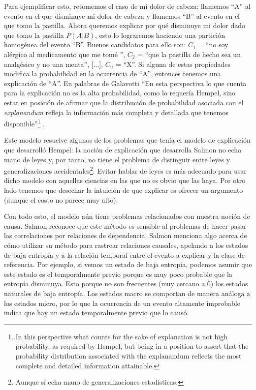 {Para ejemplificar esto, retomemos el caso de mi dolor de cabeza: llamemos ``A'' al evento en el que disminuye mi dolor de cabeza y llamemos ``B'' al evento en el que tomo la pastilla. Ahora queremos explicar por qué disminuye mi dolor dado que tomo la pastilla $P(A|B)$, esto lo lograremos haciendo una partición homogénea del evento ``B''. Buenos candidatos para ello son: $C_{1}$ = ``no soy alérgico al medicamento que me tomé '', $C_{2}$ = ``que la pastilla de hecho sea un analgésico y no una menta'', [...], $C_{n}$ = ``X''. Si alguna de estas propiedades modifica la probabilidad en la ocurrencia de ``A'', entonces tenemos una explicación de ``A''. En palabras de Galavotti ``En esta perspectiva lo que cuenta para la explicación no es la alta probabilidad, como lo requería Hempel, sino estar en posición de afirmar que la distribución de probabilidad asociada con el \textit{explanandum} refleja la información más completa y detallada que tenemos disponible''\footnote{In this perspective what counts for the sake of explanation is not high probability, as required by Hempel, but being in a position to assert that the probability distribution associated with the explanandum reflects the most complete and detailed information attainable.} \cite{Galavotti2018}.

Este modelo resuelve algunos de los problemas que tenía el modelo de explicación que desarrolló Hempel: la noción de explicación que desarrolla Salmon no echa mano de leyes y, por tanto, no tiene el problema de distinguir entre leyes y generalizaciones accidentales\footnote{Aunque sí echa mano de generalizaciones estadísticas.}. Evitar hablar de leyes es más adecuado para usar dicho modelo con aquellas ciencias en las que no es obvio que las haya. Por otro lado tenemos que desechar la intuición de que explicar es ofrecer un argumento (aunque el costo no parece muy alto).

Con todo esto, el modelo aún tiene problemas relacionados con nuestra noción de causa. Salmon reconoce que este método es sensible al problemas de hacer pasar las correlaciones por relaciones de dependencia. Salmon menciona algo acerca de cómo utilizar su método para rastrear relaciones causales, apelando a los estados de baja entropía y a la relación temporal entre el evento a explicar y la clase de referencia. Por ejemplo, si vemos un estado de baja entropía, podemos asumir que este estado es el temporalmente previo porque es muy poco probable que la entropía disminuya. Esto porque no son frecuentes (muy cercano a 0) los estados naturales de baja entropía. Los estados macro se comportan de manera análoga a los estados micro, por lo que la ocurrencia de un evento altamente improbable indica que hay un estado temporalmente previo que lo causó.

}
